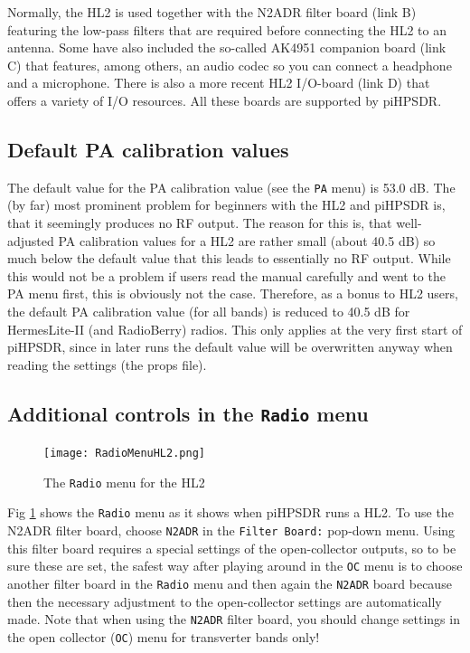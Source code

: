 \documentclass[12pt]{book}
\def\rett#1{\texttt{\color{red}#1}}
\def\bltt#1{\texttt{\color{blue}#1}}
\def\pH{pi\-HPSDR\xspace}
\begin{document}
Normally, the HL2 is used together with the N2ADR  filter
board (link B) featuring the low-pass filters that are required before connecting the HL2 to an antenna.
Some have also included the so-called AK4951 companion board (link C) that features, among others,
 an audio codec so you can connect a headphone and a microphone. There is also a more recent HL2 I/O-board
 (link D) that offers a variety of I/O resources. All these boards are supported by \pH.

\subsection{Default PA calibration values}

The default value for the PA calibration value (see the \bltt{PA} menu) is 53.0 dB. The (by far) most
prominent  problem for beginners with the HL2 and \pH is, that it seemingly produces no RF output. The reason for this
is, that well-adjusted PA calibration values for a HL2 are rather small (about 40.5 dB) so much below the default
value that this leads to essentially no RF output. While this would not be a problem if  users read the manual
carefully and went to the PA menu first, this is obviously not the case. Therefore, as a bonus to HL2 users,
the default PA calibration value (for all bands) is
reduced to 40.5 dB for HermesLite-II (and RadioBerry) radios. This only applies at the very first start
of \pH, since in later runs the default value will be overwritten anyway when reading the settings (the props
file).



\subsection{Additional controls in the \bltt{Radio} menu}

\begin{figure}[ht]
\center
\texttt{[image: RadioMenuHL2.png]}
\caption{The \bltt{Radio} menu for the HL2}
\label{fig:hl2radiomenu}
\end{figure}

 Fig \ref{fig:hl2radiomenu} shows the \bltt{Radio} menu as it shows when \pH runs a HL2. To use the N2ADR
 filter board, choose \texttt{N2ADR} in the \rett{Filter Board:} pop-down menu. Using this filter board
 requires a special settings of the open-collector outputs, so to be sure these are set, the safest way
 after playing around in the \bltt{OC} menu
 is to choose another filter board in the \bltt{Radio} menu and then again the \texttt{N2ADR} board
 because then the necessary adjustment to the open-collector settings are automatically made.
 Note that when
 using the \texttt{N2ADR} filter board, you should  change  settings in the open collector (\bltt{OC})
 menu for transverter bands only!
\end{document}
